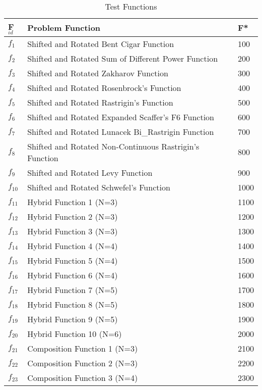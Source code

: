 \begin{table}[!htbp]
\caption{Test Functions}
\vspace{-3mm}
\centering
\begin{tabular}{|p{0.5cm}|p{5.4cm}|p{0.6cm}|}
\hline
F$_{id}$ & Problem Function & F* \\ \hline
$f_{1}$ & Shifted and Rotated Bent Cigar Function & 100 \\
\hline
$f_{2}$ & Shifted and Rotated Sum of Different Power Function & 200 \\
\hline
$f_{3}$ & Shifted and Rotated Zakharov Function & 300\\
\hline
$f_{4}$ & Shifted and Rotated Rosenbrock's Function & 400\\
\hline
$f_{5}$ & Shifted and Rotated Rastrigin's Function & 500\\
\hline
$f_{6}$ & Shifted and Rotated Expanded Scaffer's F6 Function & 600\\
\hline
$f_{7}$ & Shifted and Rotated Lunacek Bi\_Rastrigin Function & 700\\
\hline
$f_{8}$ & Shifted and Rotated Non-Continuous Rastrigin's Function & 800\\
\hline
$f_{9}$ & Shifted and Rotated Levy Function & 900\\
\hline
$f_{10}$ & Shifted and Rotated Schwefel's Function & 1000\\
\hline
$f_{11}$ & Hybrid Function 1 (N=3) & 1100\\
\hline
$f_{12}$ & Hybrid Function 2 (N=3) & 1200\\
\hline
$f_{13}$ & Hybrid Function 3 (N=3) & 1300\\
\hline
$f_{14}$ & Hybrid Function 4 (N=4) & 1400\\
\hline
$f_{15}$ & Hybrid Function 5 (N=4) & 1500\\
\hline
$f_{16}$ & Hybrid Function 6 (N=4) & 1600\\
\hline
$f_{17}$ & Hybrid Function 7 (N=5) & 1700\\
\hline
$f_{18}$ & Hybrid Function 8 (N=5) & 1800\\
\hline
$f_{19}$ & Hybrid Function 9 (N=5) & 1900\\
\hline
$f_{20}$ & Hybrid Function 10 (N=6) & 2000\\
\hline
$f_{21}$ & Composition Function 1 (N=3) & 2100\\
\hline
$f_{22}$ & Composition Function 2 (N=3) & 2200\\
\hline
$f_{23}$ & Composition Function 3 (N=4) & 2300\\

\end{tabular}
\end{table}
